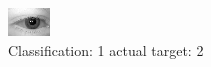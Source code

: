 \begin{figure}[h!]
\begin{center}
\includegraphics[width=0.60\columnwidth]{figures/ID399_class_1_target_2.png}
\end{center}
\caption{ Classification: 1 actual target: 2}
\label{fig:ID399_class_1_target_2}
\end{figure}
